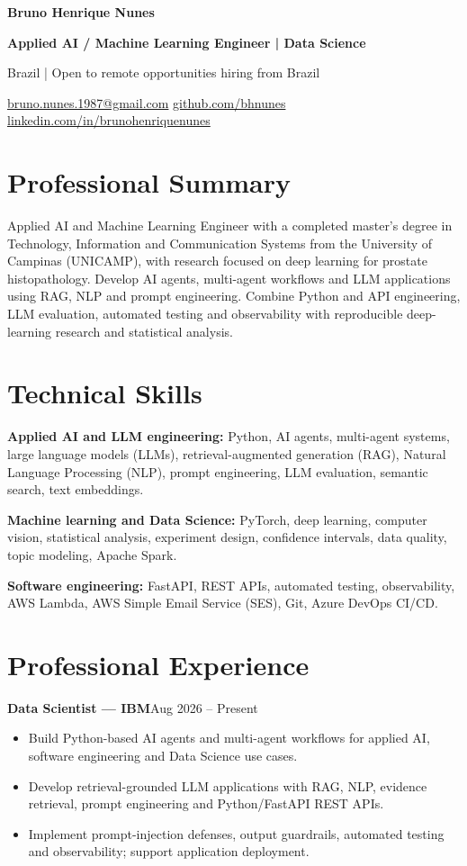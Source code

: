 \documentclass[10pt,a4paper]{article}
\newcommand{\role}[3]{\textbf{#1 --- #2}\hfill {\small #3}\par}
\begin{document}
\fontsize{10}{12.2}\selectfont

{\Large\bfseries Bruno Henrique Nunes}\par
{\large\bfseries Applied AI / Machine Learning Engineer | Data Science}\par
Brazil | Open to remote opportunities hiring from Brazil\par
\href{mailto:bruno.nunes.1987@gmail.com}{bruno.nunes.1987@gmail.com}
\quad\textbar\quad \href{https://github.com/bhnunes}{github.com/bhnunes}
\quad\textbar\quad \href{https://www.linkedin.com/in/brunohenriquenunes/}{linkedin.com/in/brunohenriquenunes}\par

\section{Professional Summary}
Applied AI and Machine Learning Engineer with a completed master's degree in Technology, Information and Communication Systems from the University of Campinas (UNICAMP), with research focused on deep learning for prostate histopathology. Develop AI agents, multi-agent workflows and LLM applications using RAG, NLP and prompt engineering. Combine Python and API engineering, LLM evaluation, automated testing and observability with reproducible deep-learning research and statistical analysis.

\section{Technical Skills}
\textbf{Applied AI and LLM engineering:} Python, AI agents, multi-agent systems, large language models (LLMs), retrieval-augmented generation (RAG), Natural Language Processing (NLP), prompt engineering, LLM evaluation, semantic search, text embeddings.\par
\textbf{Machine learning and Data Science:} PyTorch, deep learning, computer vision, statistical analysis, experiment design, confidence intervals, data quality, topic modeling, Apache Spark.\par
\textbf{Software engineering:} FastAPI, REST APIs, automated testing, observability, AWS Lambda, AWS Simple Email Service (SES), Git, Azure DevOps CI/CD.

\section{Professional Experience}
\role{Data Scientist}{IBM}{Aug 2026 -- Present}
\begin{itemize}
  \item Build Python-based AI agents and multi-agent workflows for applied AI, software engineering and Data Science use cases.
  \item Develop retrieval-grounded LLM applications with RAG, NLP, evidence retrieval, prompt engineering and Python/FastAPI REST APIs.
  \item Implement prompt-injection defenses, output guardrails, automated testing and observability; support application deployment.
\end{itemize}
\end{document}
